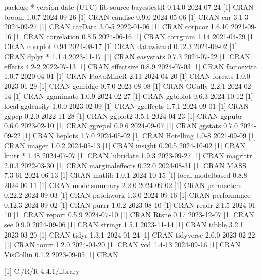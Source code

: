 \documentclass[
  letterpaper,
  10pt,
  krantz2]{krantz}
\begin{document}
package * version date (UTC) lib source bayestestR 0.14.0 2024-07-24
{[}1{]} CRAN broom 1.0.7 2024-09-26 {[}1{]} CRAN candisc 0.9.0
2024-05-06 {[}1{]} CRAN car 3.1-3 2024-09-27 {[}1{]} CRAN carData 3.0-5
2022-01-06 {[}1{]} CRAN corpcor 1.6.10 2021-09-16 {[}1{]} CRAN
correlation 0.8.5 2024-06-16 {[}1{]} CRAN corrgram 1.14 2021-04-29
{[}1{]} CRAN corrplot 0.94 2024-08-17 {[}1{]} CRAN datawizard 0.12.3
2024-09-02 {[}1{]} CRAN dplyr * 1.1.4 2023-11-17 {[}1{]} CRAN easystats
0.7.3 2024-07-22 {[}1{]} CRAN effects 4.2-2 2022-07-13 {[}1{]} CRAN
effectsize 0.8.9 2024-07-03 {[}1{]} CRAN factoextra 1.0.7 2020-04-01
{[}1{]} CRAN FactoMineR 2.11 2024-04-20 {[}1{]} CRAN forcats 1.0.0
2023-01-29 {[}1{]} CRAN genridge 0.7.0 2023-08-08 {[}1{]} CRAN GGally
2.2.1 2024-02-14 {[}1{]} CRAN gganimate 1.0.9 2024-02-27 {[}1{]} CRAN
ggbiplot 0.6.3 2024-10-12 {[}1{]} local ggdensity 1.0.0 2023-02-09
{[}1{]} CRAN ggeffects 1.7.1 2024-09-01 {[}1{]} CRAN ggpcp 0.2.0
2022-11-28 {[}1{]} CRAN ggplot2 3.5.1 2024-04-23 {[}1{]} CRAN ggpubr
0.6.0 2023-02-10 {[}1{]} CRAN ggrepel 0.9.6 2024-09-07 {[}1{]} CRAN
ggstats 0.7.0 2024-09-22 {[}1{]} CRAN heplots 1.7.0 2024-05-02 {[}1{]}
CRAN Hotelling 1.0-8 2021-09-09 {[}1{]} CRAN imager 1.0.2 2024-05-13
{[}1{]} CRAN insight 0.20.5 2024-10-02 {[}1{]} CRAN knitr * 1.48
2024-07-07 {[}1{]} CRAN lubridate 1.9.3 2023-09-27 {[}1{]} CRAN magrittr
2.0.3 2022-03-30 {[}1{]} CRAN marginaleffects 0.22.0 2024-08-31 {[}1{]}
CRAN MASS 7.3-61 2024-06-13 {[}1{]} CRAN matlib 1.0.1 2024-10-15 {[}1{]}
local modelbased 0.8.8 2024-06-11 {[}1{]} CRAN modelsummary 2.2.0
2024-09-02 {[}1{]} CRAN parameters 0.22.2 2024-09-03 {[}1{]} CRAN
patchwork 1.3.0 2024-09-16 {[}1{]} CRAN performance 0.12.3 2024-09-02
{[}1{]} CRAN purrr 1.0.2 2023-08-10 {[}1{]} CRAN readr 2.1.5 2024-01-10
{[}1{]} CRAN report 0.5.9 2024-07-10 {[}1{]} CRAN Rtsne 0.17 2023-12-07
{[}1{]} CRAN see 0.9.0 2024-09-06 {[}1{]} CRAN stringr 1.5.1 2023-11-14
{[}1{]} CRAN tibble 3.2.1 2023-03-20 {[}1{]} CRAN tidyr 1.3.1 2024-01-24
{[}1{]} CRAN tidyverse 2.0.0 2023-02-22 {[}1{]} CRAN tourr 1.2.0
2024-04-20 {[}1{]} CRAN vcd 1.4-13 2024-09-16 {[}1{]} CRAN VisCollin
0.1.2 2023-09-05 {[}1{]} CRAN

{[}1{]} C:/R/R-4.4.1/library



\backmatter
\printindex
\end{document}

